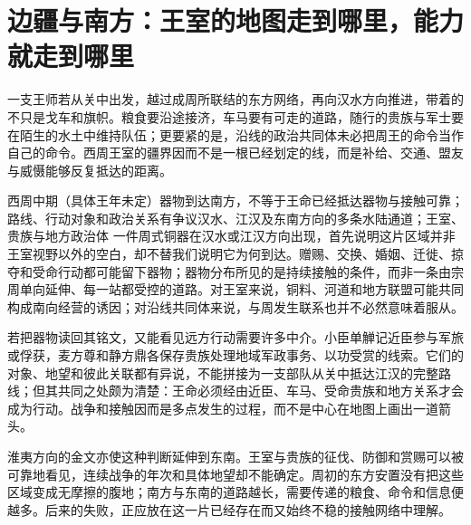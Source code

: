 \section{边疆与南方：王室的地图走到哪里，能力就走到哪里}

一支王师若从关中出发，越过成周所联结的东方网络，再向汉水方向推进，带着的不只是戈车和旗帜。粮食要沿途接济，车马要有可走的道路，随行的贵族与军士要在陌生的水土中维持队伍；更要紧的是，沿线的政治共同体未必把周王的命令当作自己的命令。西周王室的疆界因而不是一根已经划定的线，而是补给、交通、盟友与威慑能够反复抵达的距离。



\begin{event}{西周中期（具体王年未定）}{器物到达南方，不等于王命已经抵达}{器物与接触可靠；路线、行动对象和政治关系有争议}{汉水、江汉及东南方向的多条水陆通道；王室、贵族与地方政治体}
一件周式铜器在汉水或江汉方向出现，首先说明这片区域并非王室视野以外的空白，却不替我们说明它为何到达。赠赐、交换、婚姻、迁徙、掠夺和受命行动都可能留下器物；器物分布所见的是持续接触的条件，而非一条由宗周单向延伸、每一站都受控的道路。对王室来说，铜料、河道和地方联盟可能共同构成南向经营的诱因；对沿线共同体来说，与周发生联系也并不必然意味着服从。

若把器物读回其铭文，又能看见远方行动需要许多中介。小臣单觯记近臣参与军旅或俘获，麦方尊和静方鼎各保存贵族处理地域军政事务、以功受赏的线索。它们的对象、地望和彼此关联都有异说，不能拼接为一支部队从关中抵达江汉的完整路线；但其共同之处颇为清楚：王命必须经由近臣、车马、受命贵族和地方关系才会成为行动。战争和接触因而是多点发生的过程，而不是中心在地图上画出一道箭头。

淮夷方向的金文亦使这种判断延伸到东南。王室与贵族的征伐、防御和赏赐可以被可靠地看见，连续战争的年次和具体地望却不能确定。周初的东方安置没有把这些区域变成无摩擦的腹地；南方与东南的道路越长，需要传递的粮食、命令和信息便越多。后来的失败，正应放在这一片已经存在而又始终不稳的接触网络中理解。
\end{event}

